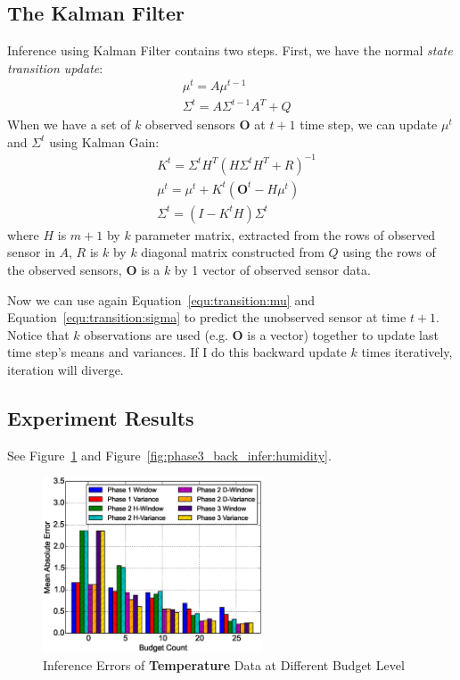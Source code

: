 \documentclass[12pt]{article}  %
\theoremstyle{definition}
\theoremstyle{remark}
\begin{document}
\subsection{The Kalman Filter}
Inference using Kalman Filter contains two steps.
First, we have the normal \textit{state transition update}:
\begin{align}
        & \mu^{t} = A \mu^{t-1} \label{equ:transition:mu} \\
        & \Sigma^{t} = A\Sigma^{t-1}A^T + Q\label{equ:transition:sigma}
\end{align}
When we have a set of $k$ observed sensors $\mathbf{O}$ at $t+1$ time step,
we can update $\mu^{t}$ and $\Sigma^{t}$ using Kalman Gain:
\begin{align}
        & K^t = \Sigma^t H^T (H\Sigma^{t}H^T + R)^{-1} \\
        & \mu^t = \mu^t + K^t(\mathbf{O}^t - H\mu^t) \\
        & \Sigma^t = (I - K^t H)\Sigma^t 
\end{align}
where $H$ is $m+1$ by $k$ parameter matrix, extracted from the rows of observed sensor in $A$,
$R$ is $k$ by $k$ diagonal matrix constructed from $Q$ using the rows of the observed sensors,
$\mathbf{O}$ is a $k$ by 1 vector of observed sensor data.

Now we can use again Equation~\ref{equ:transition:mu} and Equation~\ref{equ:transition:sigma}
to predict the unobserved sensor at time $t+1$.
Notice that $k$ observations are used (e.g. $\mathbf{O}$ is a vector)
together to update last time step's means and variances.
If I do this backward update $k$ times iteratively, iteration will diverge.


\subsection{Experiment Results}
See Figure~\ref{fig:phase3_back_infer:temperature} and Figure~\ref{fig:phase3_back_infer:humidity}.

\begin{figure}[H]
\centering
        \includegraphics[width=0.58\textwidth]{../phase3_backinfer/temperature_back_infer_err}
        \caption{Inference Errors of \textbf{Temperature} Data at Different Budget Level}
\label{fig:phase3_back_infer:temperature}
\end{figure}
\end{document}
